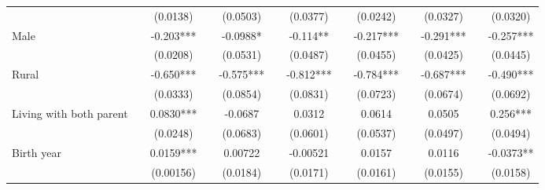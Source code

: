 \documentclass[a4paper, 12pt]{article}
\begin{document}
\begin{table}[htbp]
\begin{adjustbox}{max width=\textwidth}
\begin{tabular}{lllllllllllll}
          &       & \multicolumn{1}{c}{(0.0138)} &       & \multicolumn{1}{c}{(0.0503)} &       & \multicolumn{1}{c}{(0.0377)} &       & \multicolumn{1}{c}{(0.0242)} &       & \multicolumn{1}{c}{(0.0327)} &       & \multicolumn{1}{c}{(0.0320)} \\
    Male  &       & \multicolumn{1}{c}{-0.203***} &       & \multicolumn{1}{c}{-0.0988*} &       & \multicolumn{1}{c}{-0.114**} &       & \multicolumn{1}{c}{-0.217***} &       & \multicolumn{1}{c}{-0.291***} &       & \multicolumn{1}{c}{-0.257***} \\
          &       & \multicolumn{1}{c}{(0.0208)} &       & \multicolumn{1}{c}{(0.0531)} &       & \multicolumn{1}{c}{(0.0487)} &       & \multicolumn{1}{c}{(0.0455)} &       & \multicolumn{1}{c}{(0.0425)} &       & \multicolumn{1}{c}{(0.0445)} \\
    Rural &       & \multicolumn{1}{c}{-0.650***} &       & \multicolumn{1}{c}{-0.575***} &       & \multicolumn{1}{c}{-0.812***} &       & \multicolumn{1}{c}{-0.784***} &       & \multicolumn{1}{c}{-0.687***} &       & \multicolumn{1}{c}{-0.490***} \\
          &       & \multicolumn{1}{c}{(0.0333)} &       & \multicolumn{1}{c}{(0.0854)} &       & \multicolumn{1}{c}{(0.0831)} &       & \multicolumn{1}{c}{(0.0723)} &       & \multicolumn{1}{c}{(0.0674)} &       & \multicolumn{1}{c}{(0.0692)} \\
    Living with both parent &       & \multicolumn{1}{c}{0.0830***} &       & \multicolumn{1}{c}{-0.0687} &       & \multicolumn{1}{c}{0.0312} &       & \multicolumn{1}{c}{0.0614} &       & \multicolumn{1}{c}{0.0505} &       & \multicolumn{1}{c}{0.256***} \\
          &       & \multicolumn{1}{c}{(0.0248)} &       & \multicolumn{1}{c}{(0.0683)} &       & \multicolumn{1}{c}{(0.0601)} &       & \multicolumn{1}{c}{(0.0537)} &       & \multicolumn{1}{c}{(0.0497)} &       & \multicolumn{1}{c}{(0.0494)} \\
    Birth year &       & \multicolumn{1}{c}{0.0159***} &       & \multicolumn{1}{c}{0.00722} &       & \multicolumn{1}{c}{-0.00521} &       & \multicolumn{1}{c}{0.0157} &       & \multicolumn{1}{c}{0.0116} &       & \multicolumn{1}{c}{-0.0373**} \\
          &       & \multicolumn{1}{c}{(0.00156)} &       & \multicolumn{1}{c}{(0.0184)} &       & \multicolumn{1}{c}{(0.0171)} &       & \multicolumn{1}{c}{(0.0161)} &       & \multicolumn{1}{c}{(0.0155)} &       & \multicolumn{1}{c}{(0.0158)} \\

\end{tabular}
\end{adjustbox}
\end{table}
\end{document}
